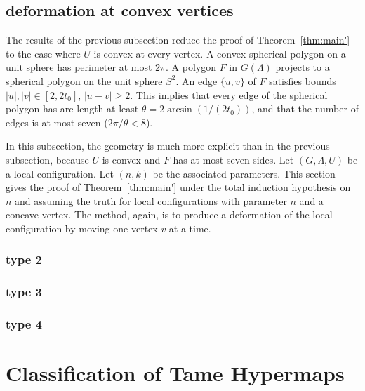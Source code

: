 \subsection{deformation at convex vertices}

The results of the previous subsection
reduce the proof of Theorem~\ref{thm:main'} to
the case where $U$ is convex at every vertex.  A convex
spherical polygon on a unit sphere has perimeter
at most $2\pi$.  A polygon $F$ in $G(\Lambda)$ projects to
a spherical polygon on the unit sphere $S^2$.  An edge $\{u,v\}$ of
$F$ satisfies bounds $|u|,|v|\in[2,2t_0]$, $|u-v|\ge 2$. This
implies that every edge of the spherical polygon has arc length
at least $\theta=2\arcsin(1/(2t_0))$, and that the number
of edges is at most seven ($2\pi/\theta < 8$).

In this subsection, the geometry is much more explicit than in the
previous subsection, because $U$ is convex and $F$ has at most seven sides.
Let $(G,\Lambda,U)$ be a local configuration.
Let $(n,k)$ be the associated parameters.
This section gives the proof of Theorem~\ref{thm:main'} under 
the total induction hypothesis on $n$ and assuming the truth
for local configurations with parameter $n$ and a concave vertex.
The method, again, is to produce a deformation of the local
configuration by moving one vertex $v$ at a time.


\subsubsection{type 2}

\subsubsection{type 3}

\subsubsection{type 4}






 









\section{Classification of Tame Hypermaps}

